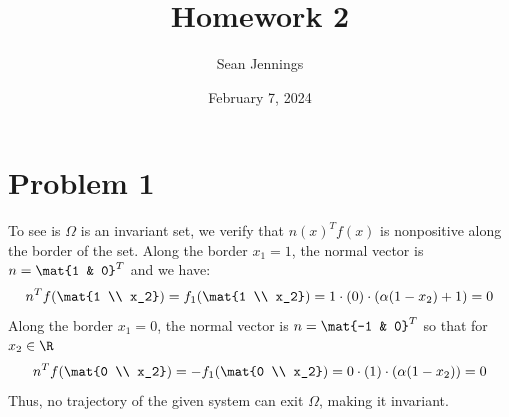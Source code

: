 \documentclass{homework}
\title{Homework 2}
\author{Sean Jennings}
\date{February 7, 2024}
\begin{document}
\maketitle

\section{Problem 1}
To see is $\Omega$ is an invariant set, we verify that $n(x)^T f(x)$
is nonpositive along the border of the set. Along the border $x_1=1$,
the normal vector is $n = \mat{1 & 0}^T$ and we have:
\begin{equation*}
    n^T f(\mat{1 \\ x_2}) = f_1(\mat{1 \\ x_2}) = 1 \cdot (0) \cdot (\alpha(1 - x_2) + 1) = 0
\end{equation*}
Along the border $x_1=0$, the normal vector is $n = \mat{-1 & 0}^T$ so that
for $x_2\in\R$
\begin{equation*}
    n^T f(\mat{0 \\ x_2}) = -f_1(\mat{0 \\ x_2}) = 0 \cdot (1) \cdot (\alpha(1 - x_2))
        = 0
\end{equation*}
Thus, no trajectory of the given system can exit $\Omega$, making it invariant.
\end{document}
